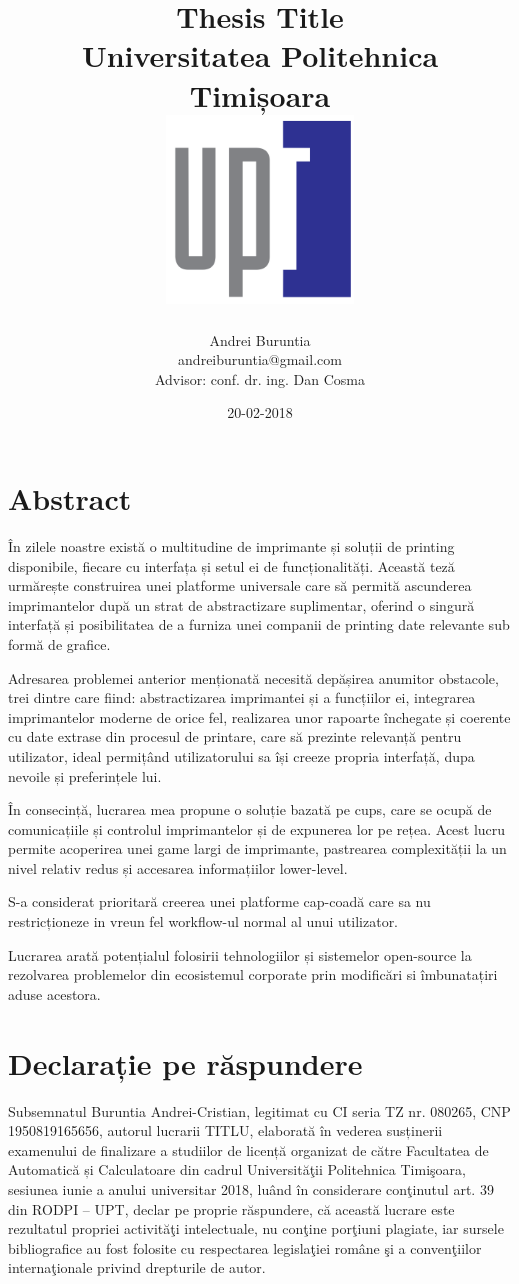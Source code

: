 \documentclass[12pt]{report}
\title{
	{Thesis Title}\\
	{\large Universitatea Politehnica Timișoara}\\
	{\includegraphics[width=50mm]{upt_logo.png}}
}
\author{Andrei Buruntia \\ andreiburuntia@gmail.com\\[1cm]{ Advisor: conf. dr. ing. Dan Cosma}}
\date{20-02-2018}
\begin{document}
\maketitle
\chapter*{Abstract}
În zilele noastre există o multitudine de imprimante și soluții de printing disponibile, fiecare cu interfața și setul ei de funcționalități. Această teză urmărește construirea unei platforme universale care să permită ascunderea imprimantelor după un strat de abstractizare suplimentar, oferind o singură interfață și posibilitatea de a furniza unei companii de printing date relevante sub formă de grafice.

Adresarea problemei anterior menționată necesită depășirea anumitor obstacole, trei dintre care fiind: abstractizarea imprimantei și a funcțiilor ei, integrarea imprimantelor moderne de orice fel, realizarea unor rapoarte închegate și coerente cu date extrase din procesul de printare, care să prezinte relevanță pentru utilizator, ideal permițând utilizatorului sa își creeze propria interfață, dupa nevoile și preferințele lui.

În consecință, lucrarea mea propune o soluție bazată pe \acrshort{cups}, care se ocupă de comunicațiile și controlul imprimantelor și de expunerea lor pe rețea. Acest lucru permite acoperirea unei game largi de imprimante, pastrearea complexității la un nivel relativ redus și accesarea informațiilor lower-level.

S-a considerat prioritară creerea unei platforme cap-coadă care sa nu restricționeze in vreun fel workflow-ul normal al unui utilizator.

Lucrarea arată potențialul folosirii tehnologiilor și sistemelor open-source la rezolvarea problemelor din ecosistemul corporate prin modificări si îmbunatațiri aduse acestora.

\newpage\null\thispagestyle{empty}\newpage

\chapter*{Declarație pe răspundere}
Subsemnatul Buruntia Andrei-Cristian, legitimat cu CI seria TZ nr. 080265, CNP 1950819165656, autorul lucrarii TITLU, elaborată în vederea susținerii examenului de finalizare a studiilor de licență organizat de către Facultatea de Automatică și Calculatoare din cadrul Universităţii Politehnica Timişoara, sesiunea iunie a anului universitar 2018, luând în considerare conţinutul art. 39 din RODPI – UPT, declar pe proprie răspundere, că această lucrare este rezultatul propriei activităţi intelectuale, nu conţine porţiuni plagiate, iar sursele bibliografice au fost folosite cu respectarea legislaţiei române şi a convenţiilor internaţionale privind drepturile de autor.
\end{document}
